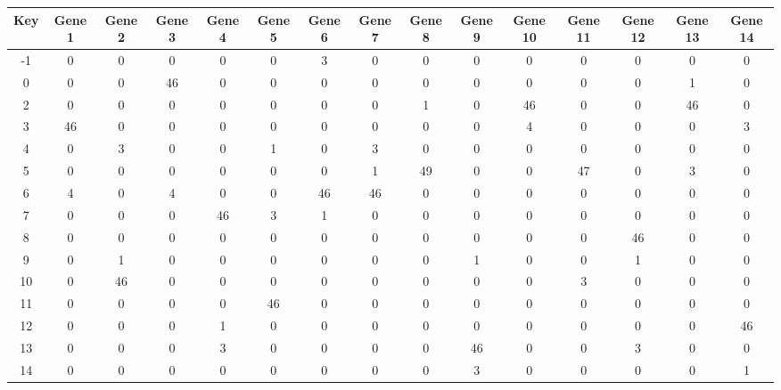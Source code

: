 \begin{tabular}{|c|c|c|c|c|c|c|c|c|c|c|c|c|c|c|}
\hline
Key & Gene 1 & Gene 2 & Gene 3 & Gene 4 & Gene 5 & Gene 6 & Gene 7 & Gene 8 & Gene 9 & Gene 10 & Gene 11 & Gene 12 & Gene 13 & Gene 14 \\
\hline
-1 & 0 & 0 & 0 & 0 & 0 & 3 & 0 & 0 & 0 & 0 & 0 & 0 & 0 & 0 \\
0 & 0 & 0 & 46 & 0 & 0 & 0 & 0 & 0 & 0 & 0 & 0 & 0 & 1 & 0 \\
2 & 0 & 0 & 0 & 0 & 0 & 0 & 0 & 1 & 0 & 46 & 0 & 0 & 46 & 0 \\
3 & 46 & 0 & 0 & 0 & 0 & 0 & 0 & 0 & 0 & 4 & 0 & 0 & 0 & 3 \\
4 & 0 & 3 & 0 & 0 & 1 & 0 & 3 & 0 & 0 & 0 & 0 & 0 & 0 & 0 \\
5 & 0 & 0 & 0 & 0 & 0 & 0 & 1 & 49 & 0 & 0 & 47 & 0 & 3 & 0 \\
6 & 4 & 0 & 4 & 0 & 0 & 46 & 46 & 0 & 0 & 0 & 0 & 0 & 0 & 0 \\
7 & 0 & 0 & 0 & 46 & 3 & 1 & 0 & 0 & 0 & 0 & 0 & 0 & 0 & 0 \\
8 & 0 & 0 & 0 & 0 & 0 & 0 & 0 & 0 & 0 & 0 & 0 & 46 & 0 & 0 \\
9 & 0 & 1 & 0 & 0 & 0 & 0 & 0 & 0 & 1 & 0 & 0 & 1 & 0 & 0 \\
10 & 0 & 46 & 0 & 0 & 0 & 0 & 0 & 0 & 0 & 0 & 3 & 0 & 0 & 0 \\
11 & 0 & 0 & 0 & 0 & 46 & 0 & 0 & 0 & 0 & 0 & 0 & 0 & 0 & 0 \\
12 & 0 & 0 & 0 & 1 & 0 & 0 & 0 & 0 & 0 & 0 & 0 & 0 & 0 & 46 \\
13 & 0 & 0 & 0 & 3 & 0 & 0 & 0 & 0 & 46 & 0 & 0 & 3 & 0 & 0 \\
14 & 0 & 0 & 0 & 0 & 0 & 0 & 0 & 0 & 3 & 0 & 0 & 0 & 0 & 1 \\
\hline
\end{tabular}